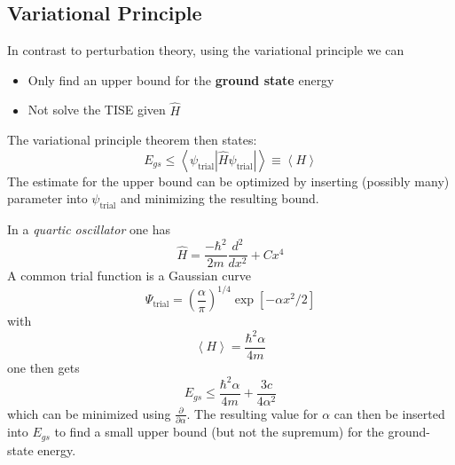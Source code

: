 \subsection{Variational Principle}
In contrast to perturbation theory, using the variational principle we can
\begin{itemize}
    \item Only find an upper bound for the \textbf{ground state} energy
    \item Not solve the TISE given $\hat{H}$
\end{itemize}
The variational principle theorem then states:
\begin{equation*}
    E_{gs}\leq\left\langle\psi_{\mathrm{trial}}\left|\hat{H} \psi_{\mathrm{trial}}\right|\right\rangle \equiv \left<H\right>
\end{equation*}
The estimate for the upper bound can be optimized by inserting (possibly many) parameter into $ \psi_{\mathrm{trial}}$ and minimizing the resulting bound.


\newpar{}

In a \textit{quartic oscillator} one has
\begin{equation*}
    \hat{H}=\frac{-\hbar^{2}}{2m}\frac{d^{2}}{dx^{2}}+Cx^{4}
\end{equation*}
A common trial function is a Gaussian curve
\begin{equation*}
    \Psi_{\mathrm{trial}}={\left(\frac{\alpha}{\pi}\right)}^{1/4}\exp\left[-\alpha x^{2}/2\right]
\end{equation*}
with
\begin{equation*}
    \left<H\right>=\frac{\hbar^2\alpha}{4m}
\end{equation*}
one then gets 
\begin{equation*}
    E_{gs}\leq\frac{\hbar^2\alpha}{4m}+\frac{3c}{4\alpha^2}
\end{equation*}
which can be minimized using $\frac{\partial}{\partial \alpha}$. The resulting value for $\alpha$ can then be inserted into $E_{gs}$ to find a small upper bound (but not the supremum) for the ground-state energy.